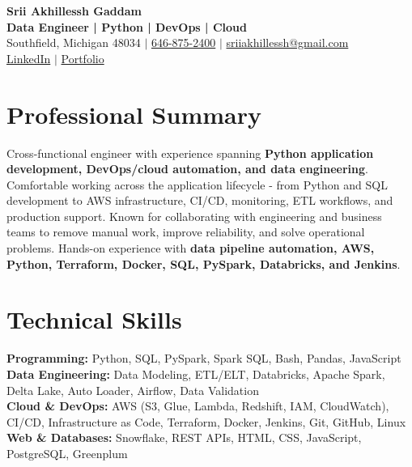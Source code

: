 \documentclass[letterpaper,10pt]{article}
\begin{document}
\fontsize{9.35pt}{10.45pt}\selectfont

\begin{center}
    {\LARGE \textbf{Srii Akhillessh Gaddam}} \\[-1pt]
    \textbf{Data Engineer | Python | DevOps | Cloud} \\[2pt]
    Southfield, Michigan 48034 $|$
    \href{tel:6468752400}{646-875-2400} $|$
    \href{mailto:sriiakhillessh@gmail.com}{sriiakhillessh@gmail.com} \\[1pt]
    \href{https://www.linkedin.com/in/srii-akhiilessh-gaddam-b48668191/}{LinkedIn} $|$
    \href{https://sriiakhillesshg.github.io/portfolio/}{Portfolio}
\end{center}
\vspace{-8pt}

\section{Professional Summary}
\small{Cross-functional engineer with experience spanning \textbf{Python application development, DevOps/cloud automation, and data engineering}. Comfortable working across the application lifecycle - from Python and SQL development to AWS infrastructure, CI/CD, monitoring, ETL workflows, and production support. Known for collaborating with engineering and business teams to remove manual work, improve reliability, and solve operational problems. Hands-on experience with \textbf{data pipeline automation, AWS, Python, Terraform, Docker, SQL, PySpark, Databricks, and Jenkins}.}

\section{Technical Skills}
\small{
\textbf{Programming:} Python, SQL, PySpark, Spark SQL, Bash, Pandas, JavaScript \\
\textbf{Data Engineering:} Data Modeling, ETL/ELT, Databricks, Apache Spark, Delta Lake, Auto Loader, Airflow, Data Validation \\
\textbf{Cloud \& DevOps:} AWS (S3, Glue, Lambda, Redshift, IAM, CloudWatch), CI/CD, Infrastructure as Code, Terraform, Docker, Jenkins, Git, GitHub, Linux \\
\textbf{Web \& Databases:} Snowflake, REST APIs, HTML, CSS, JavaScript, PostgreSQL, Greenplum
}
\end{document}
